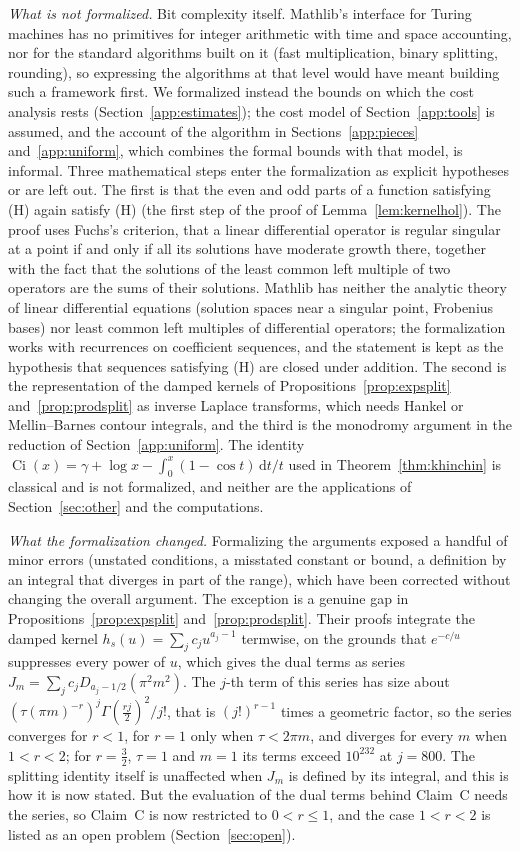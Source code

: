\documentclass[11pt,reqno]{amsart}
\theoremstyle{definition}
\theoremstyle{remark}
\newcommand{\Ci}{\operatorname{Ci}}
\begin{document}
\emph{What is not formalized.} Bit complexity itself. Mathlib's interface for Turing machines has no primitives for
integer arithmetic with time and space accounting, nor for the standard algorithms built on it (fast multiplication,
binary splitting, rounding), so expressing the algorithms at that level would have meant building such a framework
first. We formalized instead the bounds on which the cost analysis rests (Section~\ref{app:estimates}); the cost model
of Section~\ref{app:tools} is assumed, and the account of the algorithm in Sections~\ref{app:pieces}
and~\ref{app:uniform}, which combines the formal bounds with that model, is informal. Three mathematical steps enter
the formalization as explicit hypotheses or are left out. The first is that the even and odd parts of a function
satisfying (H) again satisfy (H) (the first step of the proof of Lemma~\ref{lem:kernelhol}). The proof uses Fuchs's
criterion, that a linear differential operator is regular singular at a point if and only if all its solutions have
moderate growth there, together with the fact that the solutions of the least common left multiple of two operators
are the sums of their solutions. Mathlib has neither the analytic theory of linear differential equations (solution
spaces near a singular point, Frobenius bases) nor least common left multiples of differential operators; the
formalization works with recurrences on coefficient sequences, and the statement is kept as the hypothesis that
sequences satisfying (H) are closed under addition. The second is the representation of the damped kernels of
Propositions~\ref{prop:expsplit} and~\ref{prop:prodsplit} as inverse Laplace transforms, which needs Hankel or
Mellin--Barnes contour integrals, and the third is the monodromy argument in the reduction of
Section~\ref{app:uniform}. The identity $\Ci(x) = \gamma + \log x - \int_0^x(1-\cos t)\,\mathrm dt/t$ used in
Theorem~\ref{thm:khinchin} is classical and is not formalized, and neither are the applications of
Section~\ref{sec:other} and the computations.

\emph{What the formalization changed.} Formalizing the arguments exposed a handful of minor errors (unstated
conditions, a misstated constant or bound, a definition by an integral that diverges in part of the range), which have
been corrected without changing the overall argument. The exception is a genuine gap in Propositions~\ref{prop:expsplit}
and~\ref{prop:prodsplit}. Their proofs integrate the damped kernel $h_s(u) = \sum_jc_ju^{a_j-1}$ termwise, on the
grounds that $e^{-c/u}$ suppresses every power of $u$, which gives the dual terms as series
$J_m = \sum_jc_jD_{a_j-1/2}(\pi^2m^2)$. The $j$-th term of this series has size about
$(\tau(\pi m)^{-r})^j\Gamma(\frac{rj}2)^2/j!$, that is $(j!)^{r-1}$ times a geometric factor, so the series converges
for $r < 1$, for $r = 1$ only when $\tau < 2\pi m$, and diverges for every $m$ when $1 < r < 2$; for $r = \frac32$,
$\tau = 1$ and $m = 1$ its terms exceed $10^{232}$ at $j = 800$. The splitting identity itself is unaffected when
$J_m$ is defined by its integral, and this is how it is now stated. But the evaluation of the dual terms behind Claim~C
needs the series, so Claim~C is now restricted to $0 < r \le 1$, and the case $1 < r < 2$ is listed as an open problem
(Section~\ref{sec:open}).
\end{document}
